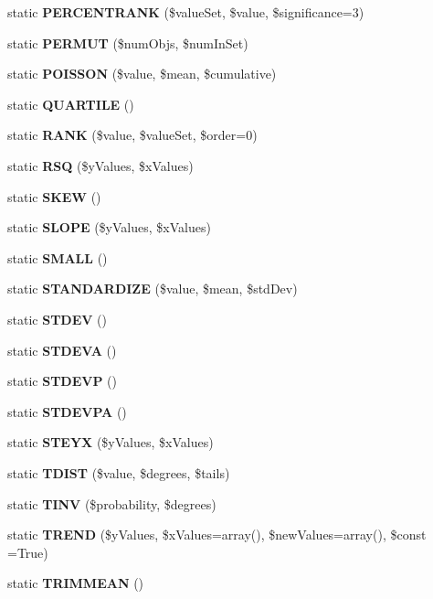 \begin{DoxyCompactItemize}
\item 
static {\bf P\+E\+R\+C\+E\+N\+T\+R\+A\+N\+K} (\$value\+Set, \$value, \$significance=3)
\item 
static {\bf P\+E\+R\+M\+U\+T} (\$num\+Objs, \$num\+In\+Set)
\item 
static {\bf P\+O\+I\+S\+S\+O\+N} (\$value, \$mean, \$cumulative)
\item 
static {\bfseries Q\+U\+A\+R\+T\+I\+L\+E} ()\label{class_p_h_p_excel___calculation___statistical_ac4a6934a8f254e4d1fd8798f6b4130d8}

\item 
static {\bf R\+A\+N\+K} (\$value, \$value\+Set, \$order=0)
\item 
static {\bf R\+S\+Q} (\$y\+Values, \$x\+Values)
\item 
static {\bf S\+K\+E\+W} ()
\item 
static {\bf S\+L\+O\+P\+E} (\$y\+Values, \$x\+Values)
\item 
static {\bfseries S\+M\+A\+L\+L} ()\label{class_p_h_p_excel___calculation___statistical_ab2c727687a0234b9e9a938dca330eaea}

\item 
static {\bf S\+T\+A\+N\+D\+A\+R\+D\+I\+Z\+E} (\$value, \$mean, \$std\+Dev)
\item 
static {\bfseries S\+T\+D\+E\+V} ()\label{class_p_h_p_excel___calculation___statistical_af0d983ba4377112d039b24f6f7f72cdb}

\item 
static {\bfseries S\+T\+D\+E\+V\+A} ()\label{class_p_h_p_excel___calculation___statistical_a40f726b9cef2f1c12df5049a6b626811}

\item 
static {\bfseries S\+T\+D\+E\+V\+P} ()\label{class_p_h_p_excel___calculation___statistical_a1078483bf68e8556e4cf5b64400b8ea0}

\item 
static {\bfseries S\+T\+D\+E\+V\+P\+A} ()\label{class_p_h_p_excel___calculation___statistical_a727f3b1ce2fc86d88647445f2aa8b3dc}

\item 
static {\bf S\+T\+E\+Y\+X} (\$y\+Values, \$x\+Values)
\item 
static {\bf T\+D\+I\+S\+T} (\$value, \$degrees, \$tails)
\item 
static {\bf T\+I\+N\+V} (\$probability, \$degrees)
\item 
static {\bf T\+R\+E\+N\+D} (\$y\+Values, \$x\+Values=array(), \$new\+Values=array(), \$const =True)
\item 
static {\bfseries T\+R\+I\+M\+M\+E\+A\+N} ()\label{class_p_h_p_excel___calculation___statistical_ad5e3f016fe621e19bb7aed8641db1f9e}


\end{DoxyCompactItemize}
